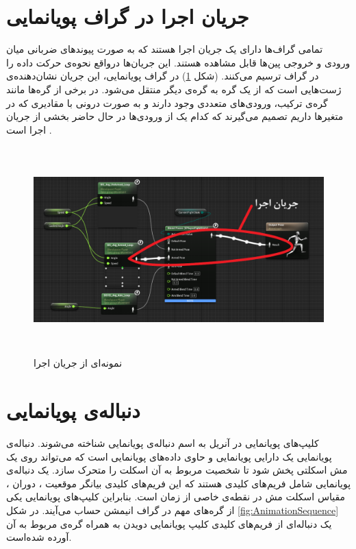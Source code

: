 \section{جریان اجرا در گراف پویانمایی}

تمامی گراف‌ها دارای یک جریان اجرا هستند که به صورت پیوند‌های ضربانی 
میان ورودی و خروجی پین‌ها قابل مشاهده هستند. این جریان‌ها درواقع نحوه‌ی حرکت داده
را در گراف ترسیم می‌کنند.
(شکل \ref{fig:ExecFlow})
در گراف پویانمایی، این جریان نشان‌دهنده‌ی ‌ژست‌هایی است که از 
یک گره به گره‌ی دیگر منتقل می‌شود.
در برخی از گره‌‌ها مانند گره‌ی ترکیب، ورودی‌های متعددی وجود دارند و به صورت 
درونی با مقادیری که در متغیر‌ها داریم تصمیم می‌گیرند که کدام یک از ورودی‌‌ها 
در حال حاضر بخشی از جریان اجرا است \cite{AnimationGraphUnrealEngine}.

\begin{figure}[ht]
	\centerline{\includegraphics[width=\textwidth,height=8cm,keepaspectratio]{Figures/Ch3/ExecFlow.png}}

	\caption{نمونه‌ای از جریان اجرا}
	\label{fig:ExecFlow}
\end{figure}





\section {دنباله‌ی پویانمایی}

کلیپ‌های پویانمایی در آنریل به اسم دنباله‌ی پویانمایی شناخته می‌شوند.
دنباله‌ی پویانمایی یک دارایی پویانمایی و  
حاوی داده‌‌های پویانمایی است که می‌تواند روی 
یک مش اسکلتی پخش شود تا شخصیت مربوط 
به آن اسکلت را متحرک سازد.
یک دنباله‌ی پویانمایی شامل فریم‌های کلیدی هستند که 
این فریم‌های کلیدی بیانگر موقعیت
، دوران 
، مقیاس
اسکلت مش در نقطه‌‌ی خاصی از زمان است.
بنابراین کلیپ‌های پویانمایی یکی از گره‌های مهم در 
گراف انیمشن حساب می‌آیند.
در شکل 
\ref{fig:AnimationSequence}
یک دنباله‌ای از فریم‌‌‌های کلیدی کلیپ پویانمایی دویدن به همراه 
گره‌ی مربوط به آن آورده شده‌است.

